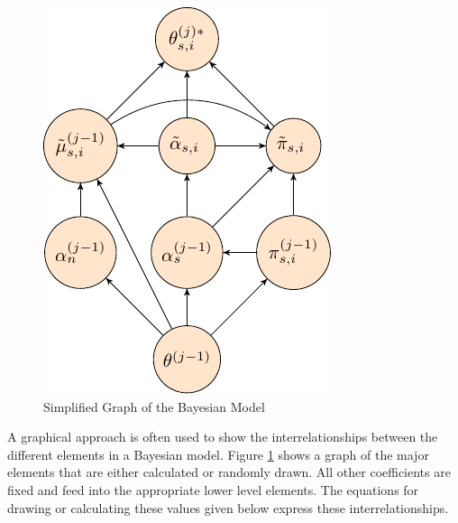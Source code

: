 \documentclass{IEEEtran}
\begin{document}
\begin{figure}[ht]
  \centering
  \includegraphics[width=1\linewidth]{bayes_graph}
  \caption{Simplified Graph of the Bayesian Model}
  \label{bayesfun}
\end{figure}

A graphical approach is often used to show the interrelationships
between the different elements in a Bayesian model.  Figure
\ref{bayesfun} shows a graph of the major elements that are either
calculated or randomly drawn.  All other coefficients are fixed and
feed into the appropriate lower level elements.  The
equations for drawing or calculating these values given below express
these interrelationships.
\end{document}
